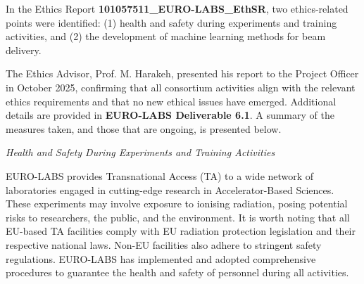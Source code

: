 

In the Ethics Report \textbf{101057511\_EURO-LABS\_EthSR}, two ethics-related points were identified: (1) health and safety during experiments and training activities, and (2) the development of machine learning methods for beam delivery.

The Ethics Advisor, Prof. M. Harakeh, presented his report to the Project Officer in October 2025, confirming that all consortium activities align with the relevant ethics requirements and that no new ethical issues have emerged. Additional details are provided in \textbf{EURO-LABS Deliverable 6.1}. A summary of the measures taken, and those that are ongoing, is presented below.

{\it Health and Safety During Experiments and Training Activities}

EURO-LABS provides Transnational Access (TA) to a wide network of laboratories engaged in cutting-edge research in Accelerator-Based Sciences. These experiments may involve exposure to ionising radiation, posing potential risks to researchers, the public, and the environment. It is worth noting that all EU-based TA facilities comply with EU radiation protection legislation and their respective national laws. Non-EU facilities also adhere to stringent safety regulations. EURO-LABS has implemented and adopted comprehensive procedures to guarantee the health and safety of personnel during all activities.

